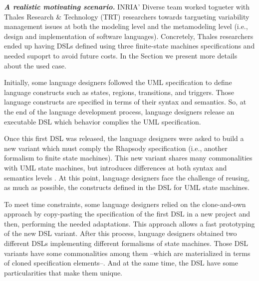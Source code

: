 

\vspace{2mm}
\textit{\textbf{A realistic motivating scenario.}}
INRIA' Diverse team worked togueter with Thales Research \& Technology (TRT) researchers towards targueting variability management issues at both the modeling level and the metamodeling level (i.e., design and implementation of software languages). Concretely, Thales researchers ended up having DSLs defined using three finite-state machines specifications and needed supoprt to avoid future costs. In the Section \label{sec:validation} we present more details about the used case.

Initially, some language designers followed the UML specification \cite{UML:2011} to define language constructs such as states, regions, transitions, and triggers. Those language constructs are specified in terms of their syntax and semantics. So, at the end of the language development process, language designers release an executable DSL which behavior complies the UML specification.

Once this first DSL was released, the language designers were asked to build a new variant which must comply the Rhapsody specification \cite{Harel:2004} (i.e., another formalism to finite state machines). This new variant shares many commonalities with UML state machines, but introduces differences at both syntax and semantics levels \cite{Crane:2007}. At this point, language designers face the challenge of reusing, as much as possible, the constructs defined in the DSL for UML state machines.

To meet time constraints, some language designers relied on the clone-and-own approach by copy-pasting the specification of the first DSL in a new project and then, performing the needed adaptations. This approach allows a fast prototyping of the new DSL variant. After this process, language designers obtained two different DSLs implementing different formalisms of state machines. Those DSL variants have some commonalities among them --which are materialized in terms of cloned specification elements--. And at the same time, the DSL have some particularities that make them unique.


